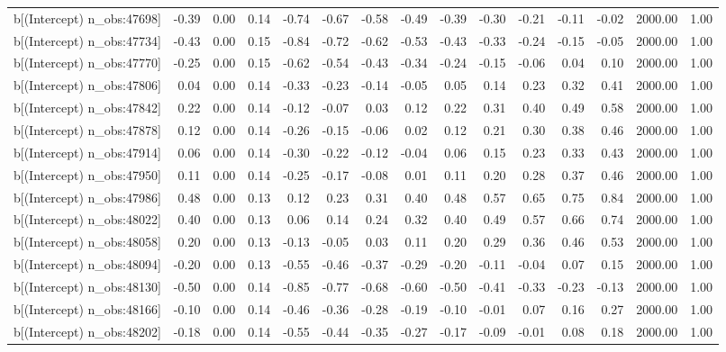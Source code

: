 \begin{table}[ht]
\begin{tabular}{rrrrrrrrrrrrrrr}
  b[(Intercept) n\_obs:47698] & -0.39 & 0.00 & 0.14 & -0.74 & -0.67 & -0.58 & -0.49 & -0.39 & -0.30 & -0.21 & -0.11 & -0.02 & 2000.00 & 1.00 \\ 
  b[(Intercept) n\_obs:47734] & -0.43 & 0.00 & 0.15 & -0.84 & -0.72 & -0.62 & -0.53 & -0.43 & -0.33 & -0.24 & -0.15 & -0.05 & 2000.00 & 1.00 \\ 
  b[(Intercept) n\_obs:47770] & -0.25 & 0.00 & 0.15 & -0.62 & -0.54 & -0.43 & -0.34 & -0.24 & -0.15 & -0.06 & 0.04 & 0.10 & 2000.00 & 1.00 \\ 
  b[(Intercept) n\_obs:47806] & 0.04 & 0.00 & 0.14 & -0.33 & -0.23 & -0.14 & -0.05 & 0.05 & 0.14 & 0.23 & 0.32 & 0.41 & 2000.00 & 1.00 \\ 
  b[(Intercept) n\_obs:47842] & 0.22 & 0.00 & 0.14 & -0.12 & -0.07 & 0.03 & 0.12 & 0.22 & 0.31 & 0.40 & 0.49 & 0.58 & 2000.00 & 1.00 \\ 
  b[(Intercept) n\_obs:47878] & 0.12 & 0.00 & 0.14 & -0.26 & -0.15 & -0.06 & 0.02 & 0.12 & 0.21 & 0.30 & 0.38 & 0.46 & 2000.00 & 1.00 \\ 
  b[(Intercept) n\_obs:47914] & 0.06 & 0.00 & 0.14 & -0.30 & -0.22 & -0.12 & -0.04 & 0.06 & 0.15 & 0.23 & 0.33 & 0.43 & 2000.00 & 1.00 \\ 
  b[(Intercept) n\_obs:47950] & 0.11 & 0.00 & 0.14 & -0.25 & -0.17 & -0.08 & 0.01 & 0.11 & 0.20 & 0.28 & 0.37 & 0.46 & 2000.00 & 1.00 \\ 
  b[(Intercept) n\_obs:47986] & 0.48 & 0.00 & 0.13 & 0.12 & 0.23 & 0.31 & 0.40 & 0.48 & 0.57 & 0.65 & 0.75 & 0.84 & 2000.00 & 1.00 \\ 
  b[(Intercept) n\_obs:48022] & 0.40 & 0.00 & 0.13 & 0.06 & 0.14 & 0.24 & 0.32 & 0.40 & 0.49 & 0.57 & 0.66 & 0.74 & 2000.00 & 1.00 \\ 
  b[(Intercept) n\_obs:48058] & 0.20 & 0.00 & 0.13 & -0.13 & -0.05 & 0.03 & 0.11 & 0.20 & 0.29 & 0.36 & 0.46 & 0.53 & 2000.00 & 1.00 \\ 
  b[(Intercept) n\_obs:48094] & -0.20 & 0.00 & 0.13 & -0.55 & -0.46 & -0.37 & -0.29 & -0.20 & -0.11 & -0.04 & 0.07 & 0.15 & 2000.00 & 1.00 \\ 
  b[(Intercept) n\_obs:48130] & -0.50 & 0.00 & 0.14 & -0.85 & -0.77 & -0.68 & -0.60 & -0.50 & -0.41 & -0.33 & -0.23 & -0.13 & 2000.00 & 1.00 \\ 
  b[(Intercept) n\_obs:48166] & -0.10 & 0.00 & 0.14 & -0.46 & -0.36 & -0.28 & -0.19 & -0.10 & -0.01 & 0.07 & 0.16 & 0.27 & 2000.00 & 1.00 \\ 
  b[(Intercept) n\_obs:48202] & -0.18 & 0.00 & 0.14 & -0.55 & -0.44 & -0.35 & -0.27 & -0.17 & -0.09 & -0.01 & 0.08 & 0.18 & 2000.00 & 1.00 \\ 

\end{tabular}
\end{table}
